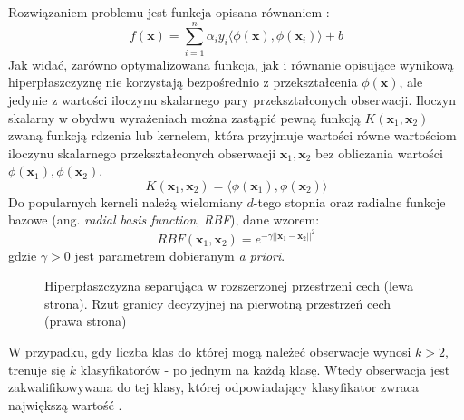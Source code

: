 \documentclass[notitlepage]{report}
\begin{document}
Rozwiązaniem problemu jest funkcja opisana równaniem \cite{eslii}:
\begin{equation}
f(\mathbf{x}) = \sum_{i=1}^{n}\alpha_iy_i\langle\phi(\mathbf{x}),\phi(\mathbf{x}_i)\rangle + b
\end{equation}
Jak widać, zarówno optymalizowana funkcja, jak i równanie opisujące wynikową hiperpłaszczyznę nie korzystają bezpośrednio z przekształcenia $\phi(\mathbf{x})$, ale jedynie z wartości iloczynu skalarnego pary przekształconych obserwacji. Iloczyn skalarny w obydwu wyrażeniach można zastąpić pewną funkcją $K(\mathbf{x}_1,\mathbf{x}_2)$ zwaną funkcją rdzenia lub kernelem, która przyjmuje wartości równe wartościom iloczynu skalarnego przekształconych obserwacji $\mathbf{x}_1,\mathbf{x}_2$ bez obliczania wartości $\phi(\mathbf{x}_1),\phi(\mathbf{x}_2)$.
\begin{equation}
K(\mathbf{x}_1,\mathbf{x}_2) = \langle\phi(\mathbf{x}_1),\phi(\mathbf{x}_2)\rangle
\end{equation}
Do popularnych kerneli należą wielomiany $d$-tego stopnia oraz radialne funkcje bazowe (ang. \textit{radial basis function}, \textit{RBF}), dane wzorem:
\begin{equation}
RBF(\mathbf{x}_1,\mathbf{x}_2) = e^{-\gamma||\mathbf{x}_1-\mathbf{x}_2||^2}
\end{equation}
gdzie $\gamma > 0$ jest parametrem dobieranym \textit{a priori}.
\begin{figure}[H]
	\centering
	\caption{Hiperpłaszczyzna separująca w rozszerzonej przestrzeni cech (lewa strona). Rzut granicy decyzyjnej na pierwotną przestrzeń cech (prawa strona) \cite{svmimg}}
\end{figure}

W przypadku, gdy liczba klas do której mogą należeć obserwacje wynosi $k > 2$, trenuje się $k$ klasyfikatorów - po jednym na każdą klasę. Wtedy obserwacja jest zakwalifikowywana do tej klasy, której odpowiadający klasyfikator zwraca największą wartość \cite{islr}.
\end{document}
